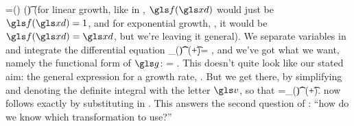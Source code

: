 \be
\gd\xd=\gf(\xd) \gd(\g \t)
\ee
(for linear growth, like in , $\gf(\xd)$ would just be $\gf(\xd)=1$, and for exponential growth, , 
it would be $\gf(\xd)=\xd$, but we're leaving it general). We separate variables in  and integrate the differential equation
\be
\int_{\xd(\t)}^{\xd(\t+\Dt)}\d\xd= \g \Dt,
\ee
and we've got what we want, namely the functional form of $\g$:
\be
\g= .
\ee
This doesn't quite look like our stated aim: the general expression for a growth rate, . But we get there, by simplifying  and denoting the definite integral with the letter $\gv$, so that
\be
 \Delta \gv=\int_{\xd(\t)}^{\xd(\t+\Dt)}\gd\xd.
\ee
{} now follows exactly by substituting  in .
This answers the second question of : ``how do we know which transformation to use?''


%
%
%
%
%
%


